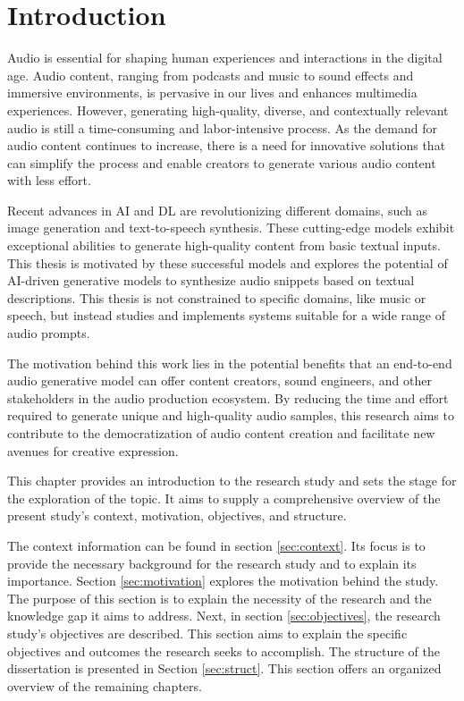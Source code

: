 \chapter{Introduction} \label{chap:intro}

\minitoc

Audio is essential for shaping human experiences and interactions in the digital age. Audio content, ranging from podcasts and music to sound effects and immersive environments, is pervasive in our lives and enhances multimedia experiences. However, generating high-quality, diverse, and contextually relevant audio is still a time-consuming and labor-intensive process. As the demand for audio content continues to increase, there is a need for innovative solutions that can simplify the process and enable creators to generate various audio content with less effort.

Recent advances in \ac{AI} and \ac{DL} are revolutionizing different domains, such as image generation and text-to-speech synthesis. These cutting-edge models exhibit exceptional abilities to generate high-quality content from basic textual inputs. This thesis is motivated by these successful models and explores the potential of \ac{AI}-driven generative models to synthesize audio snippets based on textual descriptions. This thesis is not constrained to specific domains, like music or speech, but instead studies and implements systems suitable for a wide range of audio prompts.

The motivation behind this work lies in the potential benefits that an end-to-end audio generative model can offer content creators, sound engineers, and other stakeholders in the audio production ecosystem. By reducing the time and effort required to generate unique and high-quality audio samples, this research aims to contribute to the democratization of audio content creation and facilitate new avenues for creative expression.

This chapter provides an introduction to the research study and sets the stage for the exploration of the topic. It aims to supply a comprehensive overview of the present study's context, motivation, objectives, and structure.

The context information can be found in section \ref{sec:context}. Its focus is to provide the necessary background for the research study and to explain its importance. Section \ref{sec:motivation} explores the motivation behind the study. The purpose of this section is to explain the necessity of the research and the knowledge gap it aims to address. Next, in section \ref{sec:objectives}, the research study's objectives are described. This section aims to explain the specific objectives and outcomes the research seeks to accomplish. The structure of the dissertation is presented in Section \ref{sec:struct}. This section offers an organized overview of the remaining chapters.





